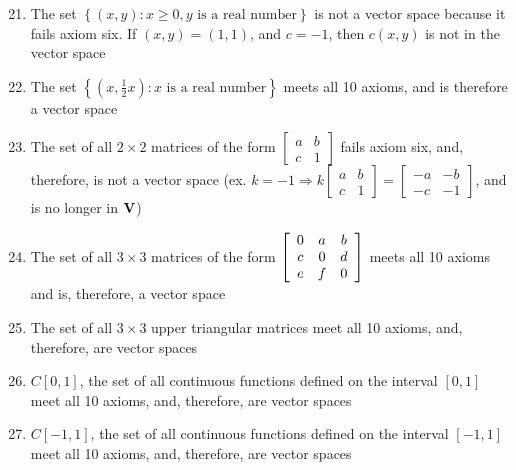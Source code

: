 \documentclass[12pt]{article}
\begin{document}
\begin{enumerate}
    \setcounter{enumi}{20}

  \item The set $\left\{ (x,y): x\geq0,y\text{ is a real number} \right\}$ is not a vector space because it fails axiom six. If $(x,y)=(1,1)$, and $c=-1$, then $c(x,y)$ is not in the vector space

    \setcounter{enumi}{23}

  \item The set $\left\{ \left( x,\frac{1}{2}x \right): x\text{ is a real number} \right\}$ meets all 10 axioms, and is therefore a vector space

    \setcounter{enumi}{25}

  \item The set of all $2\times2$ matrices of the form $\left[ \begin{array}{cc} a & b\\ c & 1  \end{array} \right]$ fails axiom six, and, therefore, is not a vector space (ex. $k=-1\Rightarrow k\left[ \begin{array}{cc} a & b\\ c & 1  \end{array} \right]=\left[ \begin{array}{cc} -a & -b\\ -c & -1  \end{array} \right]$, and is no longer in $\bold{V}$)

  \item The set of all $3\times3$ matrices of the form $\left[ \begin{array}{c c c} 0 & a & b\\ c & 0 & d\\ e & f & 0  \end{array} \right]$ meets all 10 axioms and is, therefore, a vector space

    \setcounter{enumi}{33}

  \item The set of all $3\times3$ upper triangular matrices meet all 10 axioms, and, therefore, are vector spaces

  \item $C\left[ 0,1 \right]$, the set of all continuous functions defined on the interval $[0,1]$ meet all 10 axioms, and, therefore, are vector spaces

  \item $C\left[ -1,1 \right]$, the set of all continuous functions defined on the interval $[-1,1]$ meet all 10 axioms, and, therefore, are vector spaces


\end{enumerate}
\end{document}

